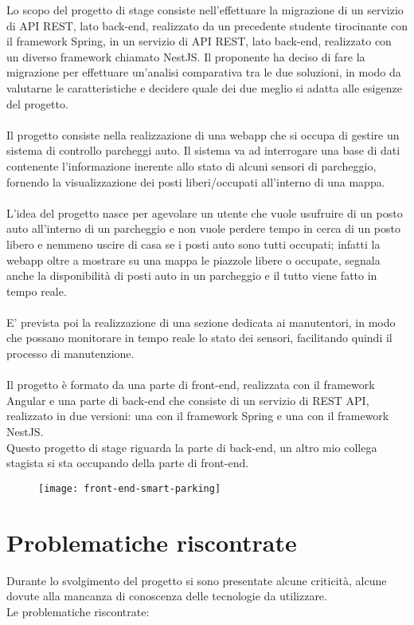 Lo scopo del progetto di stage consiste nell'effettuare la migrazione di un servizio di
API REST, lato back-end, realizzato da un precedente studente tirocinante con il framework
Spring, in un servizio di API REST, lato back-end, realizzato con un diverso framework chiamato
NestJS. Il proponente ha deciso di fare la migrazione per effettuare un'analisi comparativa tra le due soluzioni, in
modo da valutarne le caratteristiche e decidere quale dei due meglio si adatta alle esigenze
del progetto.
\\\\
Il progetto consiste nella realizzazione di una webapp che si occupa di gestire un sistema
di controllo parcheggi auto. Il sistema va ad interrogare una base di dati contenente
l'informazione inerente allo stato di alcuni sensori di parcheggio, fornendo la visualizzazione
dei posti liberi/occupati all'interno di una mappa.
\\\\
L'idea del progetto nasce per agevolare un utente che vuole usufruire di un posto auto all'interno di 
un parcheggio e non vuole perdere tempo in cerca di un posto libero e nemmeno uscire di casa se i posti auto
sono tutti occupati; infatti la webapp oltre a mostrare su una mappa le piazzole libere o occupate, segnala 
anche la disponibilità di posti auto in un parcheggio e il tutto viene fatto in tempo reale.
\\\\
E' prevista poi la realizzazione di una sezione dedicata ai manutentori, in modo che possano monitorare
in tempo reale lo stato dei sensori, facilitando quindi il processo di manutenzione.
\\\\
Il progetto è formato da una parte di front-end, realizzata con il framework Angular e una 
parte di back-end che consiste di un servizio di REST API, realizzato in due versioni: una 
con il framework Spring e una con il framework NestJS.
\\
Questo progetto di stage riguarda la parte di back-end, un altro mio collega stagista si sta occupando
della parte di front-end.
\clearpage
\begin{figure}[H]
    \centering
    \texttt{[image: front-end-smart-parking]}
\end{figure}

\section{Problematiche riscontrate}
Durante lo svolgimento del progetto si sono presentate alcune criticità, alcune dovute alla mancanza
di conoscenza delle tecnologie da utilizzare. 
\\
Le problematiche riscontrate:

